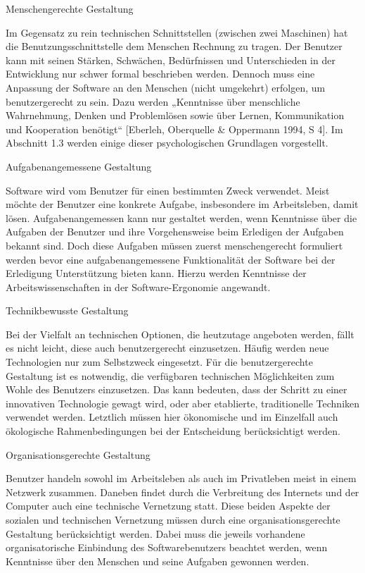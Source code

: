 \documentclass[a4paper, 12pt, twoside, BCOR=20mm, DIV=calc, abstracton, parskip=half*, toc=bibliography, toc=listof, headsepline, footsepline, headings=small, numbers=enddot]{scrreprt}
\begin{document}
Menschengerechte Gestaltung

Im Gegensatz zu rein technischen Schnittstellen (zwischen zwei Maschinen) hat die Benutzungsschnittstelle dem Menschen Rechnung zu tragen. Der Benutzer kann mit seinen Stärken, Schwächen, Bedürfnissen und Unterschieden in der Entwicklung nur schwer formal beschrieben werden. Dennoch muss eine Anpassung der Software an den Menschen (nicht umgekehrt) erfolgen, um benutzergerecht zu sein. Dazu werden „Kenntnisse über menschliche Wahrnehmung, Denken und Problemlösen sowie über Lernen, Kommunikation und Kooperation benötigt“ [Eberleh, Oberquelle \& Oppermann 1994, S 4]. Im Abschnitt 1.3 werden einige dieser psychologischen Grundlagen vorgestellt.

Aufgabenangemessene Gestaltung

Software wird vom Benutzer für einen bestimmten Zweck verwendet. Meist möchte der Benutzer eine konkrete Aufgabe, insbesondere im Arbeitsleben, damit lösen. Aufgabenangemessen kann nur gestaltet werden, wenn Kenntnisse über die Aufgaben der Benutzer und ihre Vorgehensweise beim Erledigen der Aufgaben bekannt sind. Doch diese Aufgaben müssen zuerst menschengerecht formuliert werden bevor eine aufgabenangemessene Funktionalität der Software bei der Erledigung Unterstützung bieten kann. Hierzu werden Kenntnisse der Arbeitswissenschaften in der Software-Ergonomie angewandt.

Technikbewusste Gestaltung

Bei der Vielfalt an technischen Optionen, die heutzutage angeboten werden, fällt es nicht leicht, diese auch benutzergerecht einzusetzen. Häufig werden neue Technologien nur zum Selbstzweck eingesetzt. Für die benutzergerechte Gestaltung ist es notwendig, die verfügbaren technischen Möglichkeiten zum Wohle des Benutzers einzusetzen. Das kann bedeuten, dass der Schritt zu einer innovativen Technologie gewagt wird, oder aber etablierte, traditionelle Techniken verwendet werden. Letztlich müssen hier ökonomische und im Einzelfall auch ökologische Rahmenbedingungen bei der Entscheidung berücksichtigt werden.

Organisationsgerechte Gestaltung

Benutzer handeln sowohl im Arbeitsleben als auch im Privatleben meist in einem Netzwerk zusammen. Daneben findet durch die Verbreitung des Internets und der Computer auch eine technische Vernetzung statt. Diese beiden Aspekte der sozialen und technischen Vernetzung müssen durch eine organisationsgerechte Gestaltung berücksichtigt werden. Dabei muss die jeweils vorhandene organisatorische Einbindung des Softwarebenutzers beachtet werden, wenn Kenntnisse über den Menschen und seine Aufgaben gewonnen werden.
\end{document}
